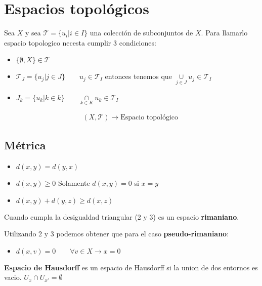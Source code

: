 \documentclass{article}
\begin{document}
\section{Espacios topológicos }
Sea $ X  $ y sea $ \mathcal T = \{u_i|i\in I \} $ una colección de subconjuntos de $ X  $. Para llamarlo espacio topologico necesta cumplir 3 condiciones: 
\begin{itemize}
  \item $ \{\emptyset, X\} \in \mathcal T $
  \item $ \mathcal T _J = \{u_j|j \in J \} \qquad u_j \in \mathcal T _I   $ entonces tenemos que $ \underset{j \in J }{\cup } u_j \in \mathcal T_I $
  \item $ J_k = \{u_k | k \in k \} \qquad \underset{k\in K }{\cap } u_k \in \mathcal T_I $
\end{itemize}
\begin{gather*}
  (X,\mathcal T ) \rightarrow \text{Espacio topológico } 
\end{gather*}

\subsection{Métrica }
\begin{itemize}
  \item $ d(x,y) = d(y,x) $
  \item $ d(x,y) \geq 0  $ Solamente $ d(x,y) = 0  $ si $ x=y $
  \item $ d(x,y) + d(y,z) \geq d(x,z) $
\end{itemize}
Cuando cumpla la desigualdad triangular (2 y 3) es un espacio\textbf{ rimaniano}.

\hfill

\hfill

Utilizando 2 y 3 podemos obtener que para el caso \textbf{pseudo-rimaniano}: 
\begin{itemize}
  \item $ d(x,v) = 0 \qquad \forall v \in X \rightarrow x = 0  $
\end{itemize}

\textbf{Espacio de Hausdorff } es un espacio de Hausdorff si la union de dos entornos es vacio. $ U_x \cap U _{x' } = \emptyset $
\end{document}
